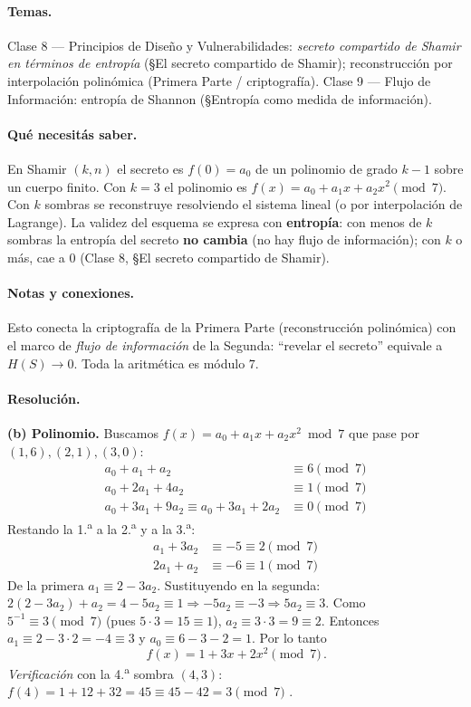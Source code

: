 \paragraph{Temas.} Clase 8 — Principios de Diseño y Vulnerabilidades: \emph{secreto compartido
de Shamir en términos de entropía} (\S El secreto compartido de Shamir); reconstrucción por
interpolación polinómica (Primera Parte / criptografía). Clase 9 — Flujo de Información:
entropía de Shannon (\S Entropía como medida de información).

\paragraph{Qué necesitás saber.} En Shamir $(k,n)$ el secreto es $f(0)=a_0$ de un polinomio
de grado $k-1$ sobre un cuerpo finito. Con $k=3$ el polinomio es
$f(x)=a_0+a_1x+a_2x^2 \pmod 7$. Con $k$ sombras se reconstruye resolviendo el sistema lineal
(o por interpolación de Lagrange). La validez del esquema se expresa con \textbf{entropía}:
con menos de $k$ sombras la entropía del secreto \textbf{no cambia} (no hay flujo de
información); con $k$ o más, cae a $0$ (Clase 8, \S El secreto compartido de Shamir).

\paragraph{Notas y conexiones.} Esto conecta la criptografía de la Primera Parte
(reconstrucción polinómica) con el marco de \emph{flujo de información} de la Segunda:
``revelar el secreto'' equivale a $H(S)\to 0$. Toda la aritmética es módulo $7$.

\paragraph{Resolución.}

\textbf{(b) Polinomio.} Buscamos $f(x)=a_0+a_1x+a_2x^2 \bmod 7$ que pase por
$(1,6),(2,1),(3,0)$:
\begin{align*}
  a_0 + a_1 + a_2 &\equiv 6 \pmod 7 \\
  a_0 + 2a_1 + 4a_2 &\equiv 1 \pmod 7 \\
  a_0 + 3a_1 + 9a_2 \equiv a_0 + 3a_1 + 2a_2 &\equiv 0 \pmod 7
\end{align*}
Restando la 1.\textsuperscript{a} a la 2.\textsuperscript{a} y a la 3.\textsuperscript{a}:
\begin{align*}
  a_1 + 3a_2 &\equiv -5 \equiv 2 \pmod 7 \\
  2a_1 + a_2 &\equiv -6 \equiv 1 \pmod 7
\end{align*}
De la primera $a_1 \equiv 2 - 3a_2$. Sustituyendo en la segunda:
$2(2-3a_2)+a_2 = 4 - 5a_2 \equiv 1 \Rightarrow -5a_2 \equiv -3 \Rightarrow 5a_2 \equiv 3$.
Como $5^{-1}\equiv 3 \pmod 7$ (pues $5\cdot3=15\equiv1$), $a_2 \equiv 3\cdot3 = 9 \equiv 2$.
Entonces $a_1 \equiv 2 - 3\cdot2 = -4 \equiv 3$ y $a_0 \equiv 6 - 3 - 2 = 1$. Por lo tanto
\begin{equation}
  \boxed{\,f(x) = 1 + 3x + 2x^2 \pmod 7\,}.
\end{equation}
\emph{Verificación} con la 4.\textsuperscript{a} sombra $(4,3)$:
$f(4)=1+12+32=45\equiv 45-42 = 3 \pmod 7$ \checkmark.

